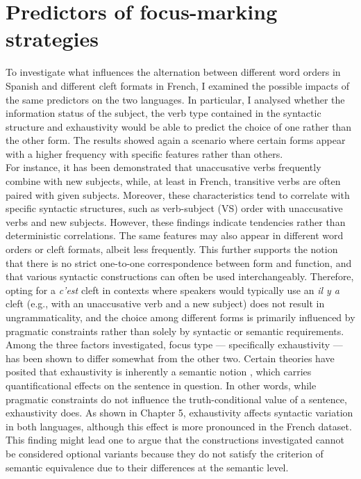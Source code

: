 \section{Predictors of focus-marking strategies}
To investigate what influences the alternation between different word orders in Spanish and different cleft formats in French, I examined the possible impacts of the same predictors on the two languages. In particular, I analysed whether the information status of the subject, the verb type contained in the syntactic structure and exhaustivity would be able to predict the choice of one rather than the other form. The results showed again a scenario where certain forms appear with a higher frequency with specific features rather than others. \\
For instance, it has been demonstrated that unaccusative verbs frequently combine with new subjects, while, at least in French, transitive verbs are often paired with given subjects. Moreover, these characteristics tend to correlate with specific syntactic structures, such as verb-subject (VS) order with unaccusative verbs and new subjects. However, these findings indicate tendencies rather than deterministic correlations. The same features may also appear in different word orders or cleft formats, albeit less frequently. This further supports the notion that there is no strict one-to-one correspondence between form and function, and that various syntactic constructions can often be used interchangeably. Therefore, opting for a \textit{c'est} cleft in contexts where speakers would typically use an \textit{il y a} cleft (e.g., with an unaccusative verb and a new subject) does not result in ungrammaticality, and the choice among different forms is primarily influenced by pragmatic constraints rather than solely by syntactic or semantic requirements.\\
Among the three factors investigated, focus type — specifically exhaustivity — has been shown to differ somewhat from the other two. Certain theories have posited that exhaustivity is inherently a semantic notion \parencite{szabolcsi1981semantics, kiss1998identificational}, which carries quantificational effects on the sentence in question. In other words, while pragmatic constraints do not influence the truth-conditional value of a sentence, exhaustivity does. As shown in Chapter 5, exhaustivity affects syntactic variation in both languages, although this effect is more pronounced in the French dataset. This finding might lead one to argue that the constructions investigated cannot be considered optional variants because they do not satisfy the criterion of semantic equivalence due to their differences at the semantic level.\\
